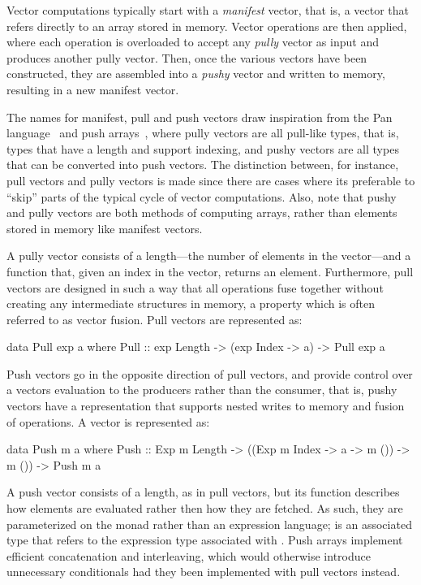 \documentclass[../paper.tex]{subfiles}
\begin{document}
Vector computations typically start with a \textit{manifest} vector, that is, a vector that refers directly to an array stored in memory. Vector operations are then applied, where each operation is overloaded to accept any \textit{pully} vector as input and produces another pully vector. Then, once the various vectors have been constructed, they are assembled into a \textit{pushy} vector and written to memory, resulting in a new manifest vector.

The names for manifest, pull and push vectors draw inspiration from the Pan language~\cite{elliott2003} and push arrays~\cite{claessen2012}, where pully vectors are all pull-like types, that is, types that have a length and support indexing, and pushy vectors are all types that can be converted into push vectors. The distinction between, for instance, pull vectors and pully vectors is made since there are cases where its preferable to ``skip'' parts of the typical cycle of vector computations. Also, note that pushy and pully vectors are both methods of computing arrays, rather than elements stored in memory like manifest vectors.

A pully vector consists of a length---the number of elements in the vector---and a function that, given an index in the vector, returns an element. Furthermore, pull vectors are designed in such a way that all operations fuse together without creating any intermediate structures in memory, a property which is often referred to as vector fusion. Pull vectors are represented as:

\begin{code}
data Pull exp a where
  Pull :: exp Length -> (exp Index -> a) -> Pull exp a
\end{code}

Push vectors go in the opposite direction of pull vectors, and provide control over a vectors evaluation to the producers rather than the consumer, that is, pushy vectors have a representation that supports nested writes to memory and fusion of operations. A  vector is represented as:

\begin{code}
data Push m a where
  Push :: Exp m Length -> ((Exp m Index -> a -> m ()) -> m ()) -> Push m a
\end{code}

\noindent A push vector consists of a length, as in pull vectors, but its function describes how elements are evaluated rather then how they are fetched. As such, they are parameterized on the monad  rather than an expression language;  is an associated type that refers to the expression type associated with . Push arrays implement efficient concatenation and interleaving, which would otherwise introduce unnecessary conditionals had they been implemented with pull vectors instead.
\end{document}
